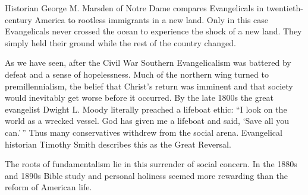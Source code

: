 Historian George M. Marsden of Notre Dame compares Evangelicals in twentieth-century America to
rootless immigrants in a new land. Only in this case Evangelicals never crossed the ocean to
experience the shock of a new land. They simply held their ground while the rest of the country
changed.

As we have seen, after the Civil War Southern Evangelicalism was battered by defeat and a sense of
hopelessness. Much of the northern wing turned to premillennialism, the belief that Christ’s return
was imminent and that society would inevitably get worse before it occurred. By the late 1800s the
great evangelist Dwight L. Moody literally preached a lifeboat ethic: “I look on the world as a
wrecked vessel. God has given me a lifeboat and said, ‘Save all you can.’\,” Thus many conservatives
withdrew from the social arena. Evangelical historian Timothy Smith describes this as the Great
Reversal.

The roots of fundamentalism lie in this surrender of social concern. In the 1880s and 1890s Bible
study and personal holiness seemed more rewarding than the reform of American life.

